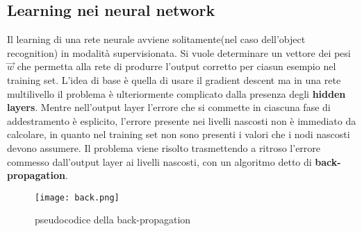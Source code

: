 \subsection{Learning nei neural network}
Il learning di una rete neurale avviene solitamente(nel caso dell'object recognition) in modalità supervisionata.  Si vuole determinare un vettore dei pesi $\vec{w}$ che permetta alla rete di produrre l'output corretto per ciasun esempio nel training set.
L'idea di base è quella di usare il gradient descent ma in una rete multilivello il problema è ulteriormente complicato dalla presenza degli \textbf{hidden layers}. Mentre nell'output layer l'errore che si commette in ciascuna fase di addestramento è esplicito, l'errore presente nei livelli nascosti
non è immediato da calcolare, in quanto nel training set non sono presenti i valori che i nodi nascosti devono assumere. Il problema viene risolto trasmettendo a ritroso
l'errore commesso dall'output layer ai livelli nascosti, con un algoritmo detto di \textbf{back-propagation}.
\begin{figure}[h]
  \texttt{[image: back.png]}
  \caption{pseudocodice della back-propagation\cite{back}}
  \label{fig:back}
\end{figure}
